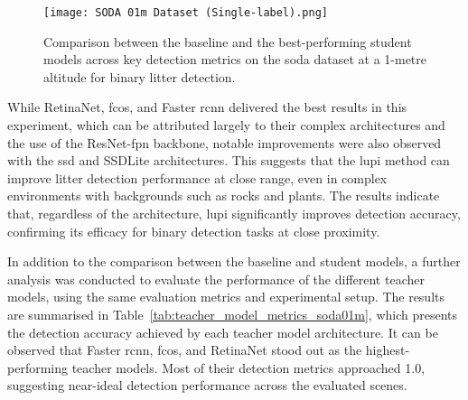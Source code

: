 \begin{figure}[!ht]
    \centering
    \texttt{[image: SODA 01m Dataset (Single-label).png]}
    \caption{Comparison between the baseline and the best-performing student models across key detection metrics on the \gls{soda} dataset at a 1-metre altitude for binary litter detection.}
    \label{fig:soda01m_bar}
\end{figure}

While RetinaNet, \gls{fcos}, and Faster \gls{rcnn} delivered the best results in this experiment, which can be attributed largely to their complex architectures and the use of the ResNet-\gls{fpn} backbone, notable improvements were also observed with the \gls{ssd} and SSDLite architectures. This suggests that the \gls{lupi} method can improve litter detection performance at close range, even in complex environments with backgrounds such as rocks and plants. The results indicate that, regardless of the architecture, \gls{lupi} significantly improves detection accuracy, confirming its efficacy for binary detection tasks at close proximity.

In addition to the comparison between the baseline and student models, a further analysis was conducted to evaluate the performance of the different teacher models, using the same evaluation metrics and experimental setup. The results are summarised in Table~\ref{tab:teacher_model_metrics_soda01m}, which presents the detection accuracy achieved by each teacher model architecture. It can be observed that Faster \gls{rcnn}, \gls{fcos}, and RetinaNet stood out as the highest-performing teacher models. Most of their detection metrics approached 1.0, suggesting near-ideal detection performance across the evaluated scenes. 

